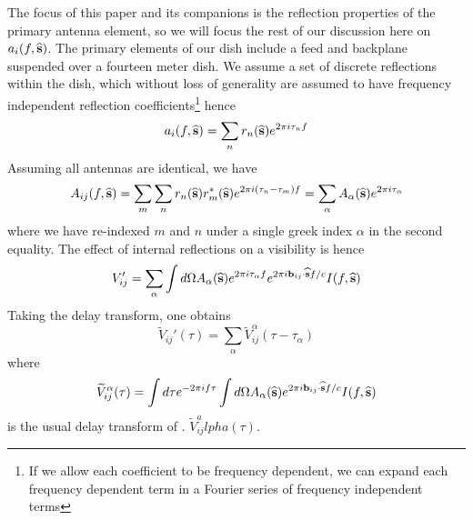 \documentclass[twocolumn]{emulateapj}
\begin{document}
The focus of this paper and its companions is the reflection properties of the primary antenna element, so we will focus the rest of our discussion here on $a_i(f,{\bf \widehat{s}})$. The primary elements of our dish include a feed and backplane suspended over a fourteen meter dish. We assume a set of discrete reflections within the dish, which without loss of generality are assumed to have frequency independent reflection coefficients\footnote{If we allow each coefficient to be frequency dependent, we can expand each frequency dependent term in a Fourier series of frequency independent terms} hence 
\begin{equation}
a_i(f,{\bf \widehat{s}}) = \sum_{n} r_n({\bf \widehat{s}}) e^{2 \pi i  \tau_n f}
\end{equation}
Assuming all antennas are identical, we have
\begin{equation}
A_{ij}(f,{\bf \widehat{s}}) = \sum_m \sum_n r_n({\bf \widehat{s}}) r_m^*({\bf \widehat{s}}) e^{2 \pi i(\tau_n-\tau_m)f} = \sum_\alpha A_\alpha({\bf \widehat{s}}) e^{2 \pi i \tau_\alpha}
\end{equation}
where we have re-indexed $m$ and $n$ under a single greek index $\alpha$ in the second equality. The effect of internal reflections on a visibility is hence
\begin{equation}
V_{ij}'= \sum_\alpha \int d \Omega A_\alpha({\bf \widehat{s}}) e^{2 \pi i \tau_\alpha f} e^{2 \pi i {\bf b}_{ij} \cdot {\bf \widehat{s}}f/c} I(f,{\bf \widehat{s}})
\end{equation}
Taking the delay transform, one obtains
\begin{equation}
\widetilde{V}_{ij}'(\tau) = \sum_\alpha \widetilde{V}_{ij}^\alpha (\tau - \tau_\alpha)
\end{equation}
where 
\begin{equation}
\widetilde{V}^\alpha_{ij}(\tau) = \int d \tau e^{-2 \pi i f \tau} \int d \Omega A_\alpha({\bf \widehat{s}}) e^{2 \pi i {\bf b}_{ij} \cdot {\bf \widehat{s}} f/c} I(f,{\bf \widehat{s}})
\end{equation}
is the usual delay transform of \citet{Parsons:2012}. $\widetilde{V}_{ij}^alpha(\tau)$.
\end{document}
